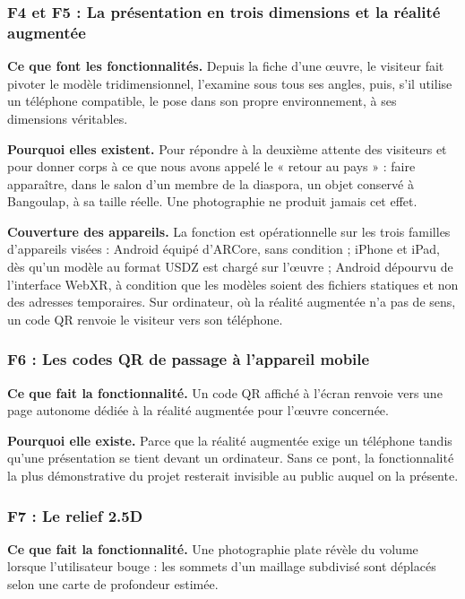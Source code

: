 \subsubsection{F4 et F5 : La présentation en trois dimensions et la réalité augmentée}

\textbf{Ce que font les fonctionnalités.} Depuis la fiche d'une œuvre, le
visiteur fait pivoter le modèle tridimensionnel, l'examine sous tous ses angles,
puis, s'il utilise un téléphone compatible, le pose dans son propre
environnement, à ses dimensions véritables.

\textbf{Pourquoi elles existent.} Pour répondre à la deuxième attente des
visiteurs et pour donner corps à ce que nous avons appelé le « retour au pays » :
faire apparaître, dans le salon d'un membre de la diaspora, un objet conservé à
Bangoulap, à sa taille réelle. Une photographie ne produit jamais cet effet.

\textbf{Couverture des appareils.} La fonction est opérationnelle sur les trois
familles d'appareils visées : Android équipé d'ARCore, sans condition ; iPhone et
iPad, dès qu'un modèle au format USDZ est chargé sur l'œuvre ; Android dépourvu
de l'interface WebXR, à condition que les modèles soient des fichiers statiques
et non des adresses temporaires. Sur ordinateur, où la réalité augmentée n'a pas
de sens, un code QR renvoie le visiteur vers son téléphone.

\subsubsection{F6 : Les codes QR de passage à l'appareil mobile}

\textbf{Ce que fait la fonctionnalité.} Un code QR affiché à l'écran renvoie
vers une page autonome dédiée à la réalité augmentée pour l'œuvre concernée.

\textbf{Pourquoi elle existe.} Parce que la réalité augmentée exige un téléphone
tandis qu'une présentation se tient devant un ordinateur. Sans ce pont, la
fonctionnalité la plus démonstrative du projet resterait invisible au public
auquel on la présente.

\subsubsection{F7 : Le relief 2.5D}

\textbf{Ce que fait la fonctionnalité.} Une photographie plate révèle du volume
lorsque l'utilisateur bouge : les sommets d'un maillage subdivisé sont déplacés
selon une carte de profondeur estimée.

